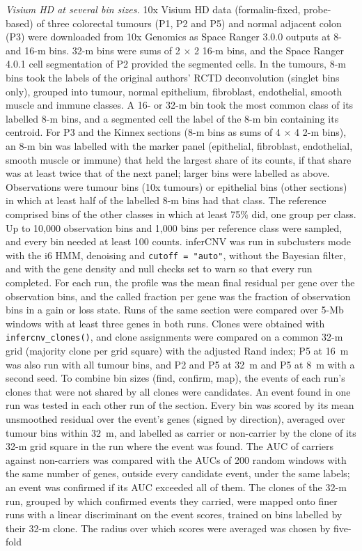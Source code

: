 \emph{Visium HD at several bin sizes.} 10x Visium HD data (formalin-fixed, probe-based) of three colorectal tumours (P1, P2 and P5) and normal adjacent colon (P3) \citep{oliveira2025visiumhd} were downloaded from 10x Genomics as Space Ranger 3.0.0 outputs at 8- and 16-\textmu m bins. 32-\textmu m bins were sums of 2 $\times$ 2 16-\textmu m bins, and the Space Ranger 4.0.1 cell segmentation of P2 provided the segmented cells. In the tumours, 8-\textmu m bins took the labels of the original authors' RCTD deconvolution \citep{cable2022rctd} (singlet bins only), grouped into tumour, normal epithelium, fibroblast, endothelial, smooth muscle and immune classes. A 16- or 32-\textmu m bin took the most common class of its labelled 8-\textmu m bins, and a segmented cell the label of the 8-\textmu m bin containing its centroid. For P3 and the Kinnex sections (8-\textmu m bins as sums of 4 $\times$ 4 2-\textmu m bins), an 8-\textmu m bin was labelled with the marker panel (epithelial, fibroblast, endothelial, smooth muscle or immune) that held the largest share of its counts, if that share was at least twice that of the next panel; larger bins were labelled as above. Observations were tumour bins (10x tumours) or epithelial bins (other sections) in which at least half of the labelled 8-\textmu m bins had that class. The reference comprised bins of the other classes in which at least 75\% did, one group per class. Up to 10,000 observation bins and 1,000 bins per reference class were sampled, and every bin needed at least 100 counts. inferCNV was run in subclusters mode with the i6 HMM, denoising and \texttt{cutoff\ =\ "auto"}, without the Bayesian filter, and with the gene density and null checks set to warn so that every run completed. For each run, the profile was the mean final residual per gene over the observation bins, and the called fraction per gene was the fraction of observation bins in a gain or loss state. Runs of the same section were compared over 5-Mb windows with at least three genes in both runs. Clones were obtained with \texttt{infercnv\_clones()}, and clone assignments were compared on a common 32-\textmu m grid (majority clone per grid square) with the adjusted Rand index; P5 at 16~\textmu m was also run with all tumour bins, and P2 and P5 at 32~\textmu m and P5 at 8~\textmu m with a second seed. To combine bin sizes (find, confirm, map), the events of each run's clones that were not shared by all clones were candidates. An event found in one run was tested in each other run of the section. Every bin was scored by its mean unsmoothed residual over the event's genes (signed by direction), averaged over tumour bins within 32~\textmu m, and labelled as carrier or non-carrier by the clone of its 32-\textmu m grid square in the run where the event was found. The AUC of carriers against non-carriers was compared with the AUCs of 200 random windows with the same number of genes, outside every candidate event, under the same labels; an event was confirmed if its AUC exceeded all of them. The clones of the 32-\textmu m run, grouped by which confirmed events they carried, were mapped onto finer runs with a linear discriminant on the event scores, trained on bins labelled by their 32-\textmu m clone. The radius over which scores were averaged was chosen by five-fold 